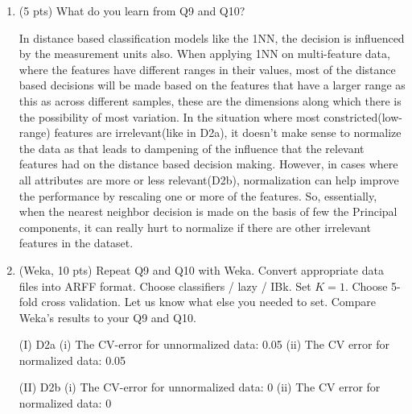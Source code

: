 \documentclass[a4paper]{article}
\theoremstyle{definition}
\newenvironment{soln}{
    \leavevmode\color{blue}\ignorespaces
}{}
\begin{document}
\begin{enumerate}
\begin{soln}
\end{soln}

\item (5 pts) What do you learn from Q9 and Q10?

\begin{soln}
In distance based classification models like the 1NN, the decision is influenced by the measurement units also. When applying 1NN on multi-feature data, where the features have different ranges in their values, most of the distance based decisions will be made based on the features that have a larger range as this as across different samples, these are the dimensions along which there is the possibility of most variation. In the situation where most constricted(low-range) features are irrelevant(like in D2a), it doesn't make sense to normalize the data as that leads to dampening of the influence that the relevant features had on the distance based decision making. However, in cases where all attributes are more or less relevant(D2b), normalization can help improve the performance by rescaling one or more of the features. So, essentially, when the nearest neighbor decision is made on the basis of few the Principal components, it can really hurt to normalize if there are other irrelevant features in the dataset. 
\end{soln}


\item (Weka, 10 pts)
Repeat Q9 and Q10 with Weka.
Convert appropriate data files into ARFF format.
Choose classifiers / lazy / IBk.
Set $K=1$.
Choose 5-fold cross validation.
Let us know what else you needed to set.  Compare Weka's results to your Q9 and Q10.


\begin{soln}
	(I) D2a
	\newline
	    (i) The CV-error for unnormalized data: 0.05 
	    \newline
 		(ii) The CV error for normalized data: 0.05
 		
	(II) D2b
	\newline 
		(i) The CV-error for unnormalized data: 0
		\newline 
		(ii) The CV error for normalized data: 0
	
\end{soln}

\end{enumerate}


\end{document}

